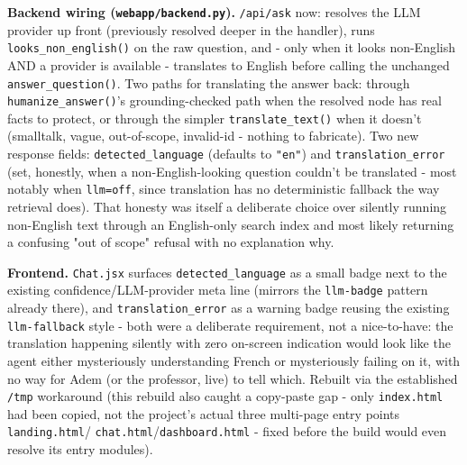 \textbf{Backend wiring (\texttt{webapp/\allowbreak{}backend.py}).} \texttt{/\allowbreak{}api/\allowbreak{}ask} now: resolves the LLM provider up front (previously resolved deeper in the handler), runs \texttt{looks\_\allowbreak{}non\_\allowbreak{}english()} on the raw question, and - only when it looks non-English AND a provider is available - translates to English before calling the unchanged \texttt{answer\_\allowbreak{}question()}. Two paths for translating the answer back: through \texttt{humanize\_\allowbreak{}answer()}'s grounding-checked path when the resolved node has real facts to protect, or through the simpler \texttt{translate\_\allowbreak{}text()} when it doesn't (smalltalk, vague, out-of-scope, invalid-id - nothing to fabricate). Two new response fields: \texttt{detected\_\allowbreak{}language} (defaults to \texttt{"en"}) and \texttt{translation\_\allowbreak{}error} (set, honestly, when a non-English-looking question couldn't be translated - most notably when \texttt{llm=off}, since translation has no deterministic fallback the way retrieval does). That honesty was itself a deliberate choice over silently running non-English text through an English-only search index and most likely returning a confusing "out of scope" refusal with no explanation why.

\textbf{Frontend.} \texttt{Chat.jsx} surfaces \texttt{detected\_\allowbreak{}language} as a small badge next to the existing confidence/LLM-provider meta line (mirrors the \texttt{llm-badge} pattern already there), and \texttt{translation\_\allowbreak{}error} as a warning badge reusing the existing \texttt{llm-fallback} style - both were a deliberate requirement, not a nice-to-have: the translation happening silently with zero on-screen indication would look like the agent either mysteriously understanding French or mysteriously failing on it, with no way for Adem (or the professor, live) to tell which. Rebuilt via the established \texttt{/\allowbreak{}tmp} workaround (this rebuild also caught a copy-paste gap - only \texttt{index.html} had been copied, not the project's actual three multi-page entry points \texttt{landing.html}/ \texttt{chat.html}/\texttt{dashboard.html} - fixed before the build would even resolve its entry modules).

